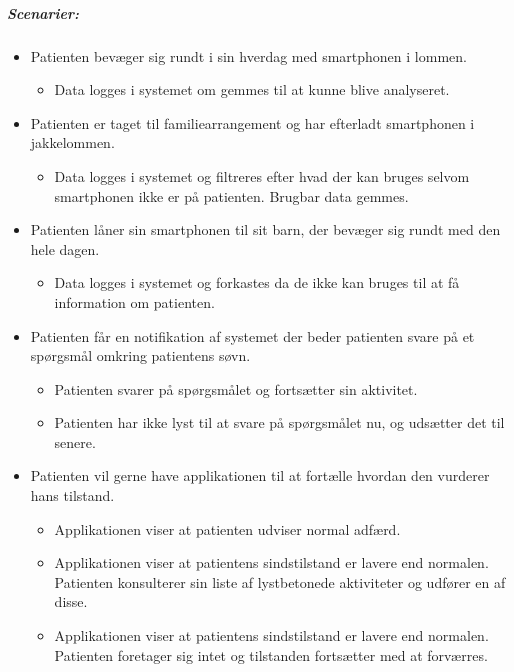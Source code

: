 \subparagraph{Scenarier:}
\begin{itemize}
	\item Patienten bevæger sig rundt i sin hverdag med smartphonen i lommen. 
	\begin{itemize}
		\item Data logges i systemet om gemmes til at kunne blive analyseret.
	\end{itemize}
	
	\item Patienten er taget til familiearrangement og har efterladt smartphonen i jakkelommen.
	\begin{itemize}
		\item Data logges i systemet og filtreres efter hvad der kan bruges selvom smartphonen ikke er på patienten.
		Brugbar data gemmes.
	\end{itemize}
	
	\item Patienten låner sin smartphonen til sit barn, der bevæger sig rundt med den hele dagen.
	\begin{itemize}
		\item Data logges i systemet og forkastes da de ikke kan bruges til at få information om patienten.
	\end{itemize}
	
	\item Patienten får en notifikation af systemet der beder patienten svare på et spørgsmål omkring patientens søvn.
	\begin{itemize}
		\item Patienten svarer på spørgsmålet og fortsætter sin aktivitet.
		\item Patienten har ikke lyst til at svare på spørgsmålet nu, og udsætter det til senere.
	\end{itemize}
	
	\item Patienten vil gerne have applikationen til at fortælle hvordan den vurderer hans tilstand.
	\begin{itemize}
		\item Applikationen viser at patienten udviser normal adfærd.
		\item Applikationen viser at patientens sindstilstand er lavere end normalen. Patienten konsulterer sin liste af lystbetonede aktiviteter og udfører en af disse.
		\item Applikationen viser at patientens sindstilstand er lavere end normalen. Patienten foretager sig intet og tilstanden fortsætter med at forværres.
	\end{itemize}

\end{itemize}

